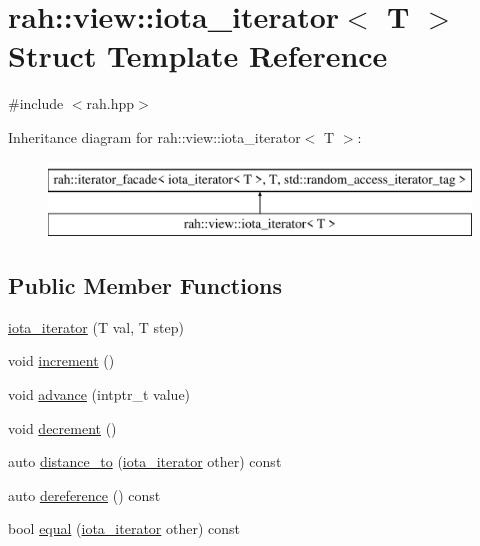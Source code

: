 \hypertarget{structrah_1_1view_1_1iota__iterator}{}\section{rah\+::view\+::iota\+\_\+iterator$<$ T $>$ Struct Template Reference}
\label{structrah_1_1view_1_1iota__iterator}


{\ttfamily \#include $<$rah.\+hpp$>$}

Inheritance diagram for rah\+::view\+::iota\+\_\+iterator$<$ T $>$\+:\begin{figure}[H]
\begin{center}
\leavevmode
\includegraphics[height=2.000000cm]{structrah_1_1view_1_1iota__iterator}
\end{center}
\end{figure}
\subsection*{Public Member Functions}
\begin{DoxyCompactItemize}
\item 
\mbox{\hyperlink{structrah_1_1view_1_1iota__iterator_a7807733a9a9609f8b9652e270551dc9b}{iota\+\_\+iterator}} (T val, T step)
\item 
void \mbox{\hyperlink{structrah_1_1view_1_1iota__iterator_a52be6587654c9783137bf31d800f315d}{increment}} ()
\item 
void \mbox{\hyperlink{structrah_1_1view_1_1iota__iterator_afdc7732c688daecb60d17b45a678e1f1}{advance}} (intptr\+\_\+t value)
\item 
void \mbox{\hyperlink{structrah_1_1view_1_1iota__iterator_ab11421ab7ec8d986bdf7ef5f930d0b43}{decrement}} ()
\item 
auto \mbox{\hyperlink{structrah_1_1view_1_1iota__iterator_a3662abe8721e4c5c7bbc4214e36c4920}{distance\+\_\+to}} (\mbox{\hyperlink{structrah_1_1view_1_1iota__iterator}{iota\+\_\+iterator}} other) const
\item 
auto \mbox{\hyperlink{structrah_1_1view_1_1iota__iterator_ae31c733c52f77c7c199802db6638541d}{dereference}} () const
\item 
bool \mbox{\hyperlink{structrah_1_1view_1_1iota__iterator_ada1691e363efa9b5c945a302296e63d5}{equal}} (\mbox{\hyperlink{structrah_1_1view_1_1iota__iterator}{iota\+\_\+iterator}} other) const
\end{DoxyCompactItemize}
